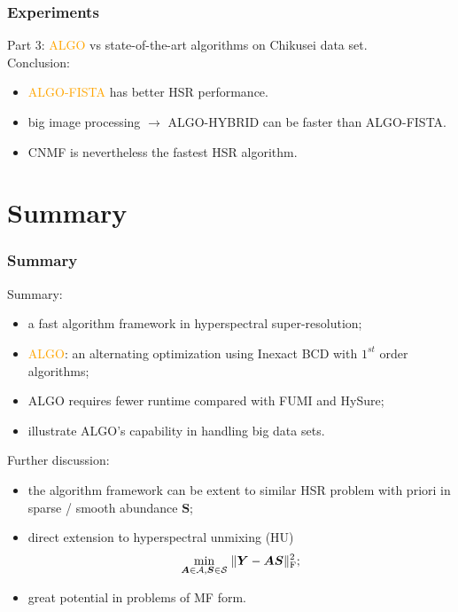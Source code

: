\documentclass[10pt,mathserif]{beamer}
\newcommand{\Fr}{_\text F}
\begin{document}
    \begin{frame}
        \frametitle{Experiments}
        Part 3: \textcolor{orange}{ALGO} vs state-of-the-art algorithms on Chikusei data set. \\
        Conclusion:
        \begin{itemize}
            \item \textcolor{orange}{ALGO-FISTA} has better HSR performance.
            \item big image processing $\rightarrow$ ALGO-HYBRID can be faster than ALGO-FISTA.
            \item CNMF is nevertheless the fastest HSR algorithm.
        \end{itemize}
    \end{frame}
\section{Summary}
    \begin{frame}
        \frametitle{Summary}
        Summary:
        \begin{itemize}
            \item a fast algorithm framework in hyperspectral super-resolution;
            \item \textcolor{orange}{ALGO}: an alternating optimization using Inexact BCD \newline
                  with $1^{st}$ order algorithms;
            \item ALGO requires fewer runtime compared with FUMI and HySure;
            \item illustrate ALGO's capability in handling big data sets.
        \end{itemize}
        \vspace{0.35cm}
        Further discussion:
        \begin{itemize}
            \item the algorithm framework can be extent to similar HSR problem
                  with priori in sparse / smooth abundance $\bm S$;
            \item direct extension to hyperspectral unmixing (HU)
                  \[ \underset{\bm A\in\mathcal A,\bm S\in\mathcal S}{\min} \;
                     \Vert \bm Y - \bm A \bm S \Vert\Fr^2; \]
            \item great potential in problems of MF form.
        \end{itemize}
    \end{frame}
\end{document}
